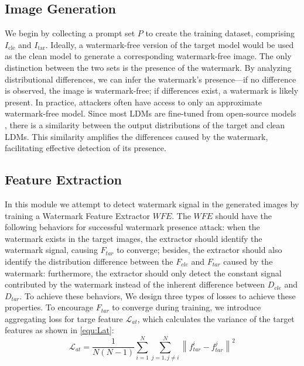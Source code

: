 \subsection{Image Generation}
We begin by collecting a prompt set \(P\) to create the training dataset, comprising \(I_{\text{cle}}\) and \(I_{\text{tar}}\). Ideally, a watermark-free version of the target model would be used as the clean model to generate a corresponding watermark-free image. The only distinction between the two sets is the presence of the watermark. By analyzing distributional differences, we can infer the watermark's presence—if no difference is observed, the image is watermark-free; if differences exist, a watermark is likely present.
In practice, attackers often have access to only an approximate watermark-free model. Since most LDMs are fine-tuned from open-source models \cite{10377881,10.1145/3658170}, there is a similarity between the output distributions of the target and clean LDMs. This similarity amplifies the differences caused by the watermark, facilitating effective detection of its presence.

\subsection{Feature Extraction}
\label{sec:feature_extraction}
  
In this module we attempt to detect watermark signal in the generated images by training a Watermark Feature Extractor $WFE$.  The $WFE$ should have the following behaviors for successful watermark presence attack: when the watermark exists in the target images, the extractor should identify the watermark signal, causing \(F_{tar}\) to converge; besides, the extractor should also identify the distribution difference between the \(F_{cle}\) and \(F_{tar}\) caused by the watermark: furthermore, the extractor should only detect the constant signal contributed by the watermark instead of the inherent difference between \(D_{cle}\) and \(D_{tar}\). To achieve these behaviors, We design three types of losses to achieve these properties. To encourage  \(F_{tar}\) to converge during training, we introduce aggregating loss for targe feature \(\mathcal{L}_{at}\), which calculates the variance of the target features as shown in \cref{equ:Lat}:
\begin{equation}
\mathcal{L}_{at}=\frac{1}{N(N-1)} \sum_{i=1}^{N} \sum_{j=1, j \neq i}^{N} \left\|f_{{tar}}^i-f_{{tar}}^j\right\|^2
\label{equ:Lat}
\end{equation}

